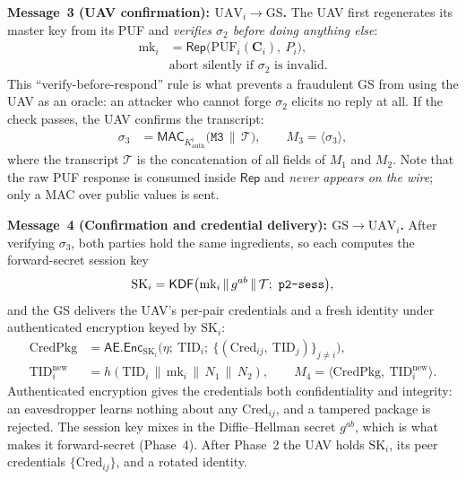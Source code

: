 \documentclass[11pt,a4paper]{article}
\begin{document}
\textbf{Message~3 (UAV confirmation): $\text{UAV}_i \rightarrow \text{GS}$.}
The UAV first regenerates its master key from its PUF and \emph{verifies
$\sigma_2$ before doing anything else}:
\begin{align}
\text{mk}_i &= \mathsf{Rep}\big(\text{PUF}_i(\bm{C}_i),\ P_i\big), \\[1ex]
&\text{abort silently if } \sigma_2 \text{ is invalid.}
\end{align}
This ``verify-before-respond'' rule is what prevents a fraudulent GS from using
the UAV as an oracle: an attacker who cannot forge $\sigma_2$ elicits no reply
at all. If the check passes, the UAV confirms the transcript:
\begin{align}
\sigma_3 &= \mathsf{MAC}_{K^{i}_{\text{auth}}}\big(\texttt{M3}\,\|\,\mathcal{T}\big), \qquad
M_3 = \langle \sigma_3 \rangle,
\end{align}
where the transcript $\mathcal{T}$ is the concatenation of all fields of $M_1$
and $M_2$. Note that the raw PUF response is consumed inside $\mathsf{Rep}$ and
\emph{never appears on the wire}; only a MAC over public values is sent.

\textbf{Message~4 (Confirmation and credential delivery): $\text{GS} \rightarrow \text{UAV}_i$.}
After verifying $\sigma_3$, both parties hold the same ingredients, so each
computes the forward-secret session key
\begin{equation}
\text{SK}_i = \mathsf{KDF}\big(\text{mk}_i \,\|\, g^{ab} \,\|\, \mathcal{T};\ \texttt{p2\text{-}sess}\big),
\label{eq:sk_p2}
\end{equation}
and the GS delivers the UAV's per-pair credentials and a fresh identity under
authenticated encryption keyed by $\text{SK}_i$:
\begin{align}
\text{CredPkg} &= \mathsf{AE}.\mathsf{Enc}_{\text{SK}_i}\big(\eta;\ \text{TID}_i;\ \{(\text{Cred}_{ij},\ \text{TID}_j)\}_{j\neq i}\big), \\[1ex]
\text{TID}_i^{\text{new}} &= h(\text{TID}_i \,\|\, \text{mk}_i \,\|\, N_1 \,\|\, N_2), \qquad
M_4 = \langle \text{CredPkg},\ \text{TID}_i^{\text{new}} \rangle.
\end{align}
Authenticated encryption gives the credentials both confidentiality and
integrity: an eavesdropper learns nothing about any $\text{Cred}_{ij}$, and a
tampered package is rejected. The session key mixes in the Diffie--Hellman
secret $g^{ab}$, which is what makes it forward-secret (Phase~4). After
Phase~2 the UAV holds $\text{SK}_i$, its peer credentials
$\{\text{Cred}_{ij}\}$, and a rotated identity.
\end{document}
